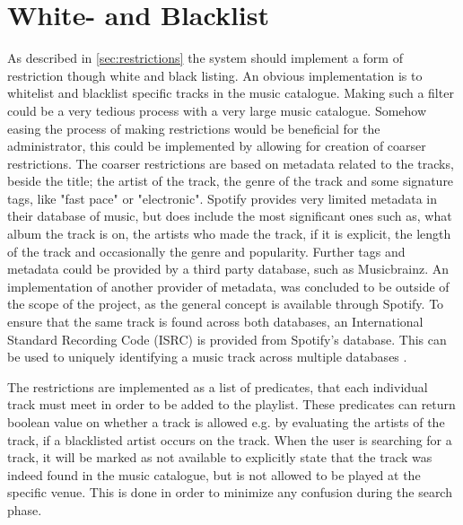 \section{White- and Blacklist}
As described in \cref{sec:restrictions} the system should implement a form of restriction though white and black listing. An obvious implementation is to whitelist and blacklist specific tracks in the music catalogue. Making such a filter could be a very tedious process with a very large music catalogue. Somehow easing the process of making restrictions would be beneficial for the administrator, this could be implemented by allowing for creation of coarser restrictions. The coarser restrictions are based on metadata related to the tracks, beside the title; the artist of the track, the genre of the track and some signature tags, like "fast pace" or "electronic". Spotify provides very limited metadata in their database of music, but does include the most significant ones such as, what album the track is on, the artists who made the track, if it is explicit, the length of the track and occasionally the genre and popularity. Further tags and metadata could be provided by a third party database, such as Musicbrainz. An implementation of another provider of metadata, was concluded to be outside of the scope of the project, as the general concept is available through Spotify. To ensure that the same track is found across both databases, an International Standard Recording Code (ISRC) is provided from Spotify’s database. This can be used to uniquely identifying a music track across multiple databases \cite{isrc}.

The restrictions are implemented as a list of predicates, that each individual track must meet in order to be added to the playlist. These predicates can return boolean value on whether a track is allowed e.g. by evaluating the artists of the track, if a blacklisted artist occurs on the track. When the user is searching for a track, it will be marked as not available to explicitly state that the track was indeed found in the music catalogue, but is not allowed to be played at the specific venue. This is done in order to minimize any confusion during the search phase.
